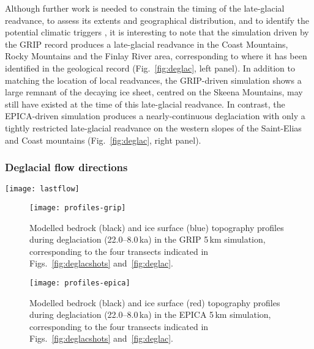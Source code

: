 \documentclass[tc]{copernicus}
\begin{document}
Although further work is needed to constrain the timing of the late-glacial
readvance, to assess its extents and geographical distribution, and to identify
the potential climatic triggers \citep{Menounos.etal.2008}, it is interesting
to note that the simulation driven by the GRIP record produces a late-glacial
readvance in the Coast Mountains, Rocky Mountains and the Finlay River area,
corresponding to where it has been identified in the geological record
(Fig.~\ref{fig:deglac}, left panel). In addition to matching the location of
local readvances, the GRIP-driven simulation shows a large remnant of the
decaying ice sheet, centred on the Skeena Mountains, may still have existed
at the time of this late-glacial readvance.
In contrast, the EPICA-driven simulation produces a nearly-continuous
deglaciation with only a tightly restricted late-glacial readvance on the
western slopes of the Saint-Elias and Coast mountains
(Fig.~\ref{fig:deglac}, right panel).


\subsubsection{Deglacial flow directions}

\begin{figure*}
  \texttt{[image: lastflow]}
  \caption{Modelled deglacial basal ice velocities. Hatches
           indicate areas that remain non-sliding throughout deglaciation
           (22.0--8.0\,ka), notably including parts of the Interior Plateau (IP).
           Note the concentric patterns of deglacial flow in the Liard
           Lowland (LL).
           Sliding grid cells were distinguished from non-sliding grid cells
           using a velocity threshold of 1\,\unit{m\,yr^{-1}}.
           Dashed segments indicate the location of profiles used in
           Figs.~\ref{fig:profiles-grip} and~\ref{fig:profiles-epica}.}
  \label{fig:lastflow}
\end{figure*}

\begin{figure}
  \texttt{[image: profiles-grip]}
  \caption{Modelled bedrock (black) and ice surface (blue) topography profiles
           during deglaciation (22.0--8.0\,ka) in the GRIP 5\,km
           simulation, corresponding to the four transects indicated in
           Figs.~\ref{fig:deglacshots} and~\ref{fig:deglac}.}
  \label{fig:profiles-grip}
\end{figure}

\begin{figure}
  \texttt{[image: profiles-epica]}
  \caption{Modelled bedrock (black) and ice surface (red) topography profiles
           during deglaciation (22.0--8.0\,ka) in the EPICA 5\,km
           simulation, corresponding to the four transects indicated in
           Figs.~\ref{fig:deglacshots} and~\ref{fig:deglac}.}
  \label{fig:profiles-epica}
\end{figure}
\end{document}
